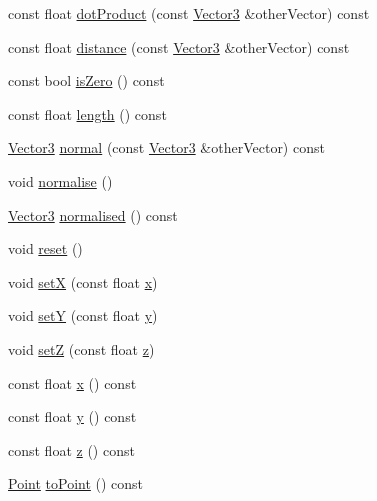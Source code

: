 \begin{DoxyCompactItemize}
\item 
const float \hyperlink{classprism_1_1_vector3_a8ce2bae07d8ac9f088fed29ed036cbd1}{dot\+Product} (const \hyperlink{classprism_1_1_vector3}{Vector3} \&other\+Vector) const 
\item 
const float \hyperlink{classprism_1_1_vector3_a72eac07134d9a15a6f87f9fd29cc716a}{distance} (const \hyperlink{classprism_1_1_vector3}{Vector3} \&other\+Vector) const 
\item 
const bool \hyperlink{classprism_1_1_vector3_ab8ee6e427e50070a85aeb07d417b7ea1}{is\+Zero} () const 
\item 
const float \hyperlink{classprism_1_1_vector3_a0d0e7d76a7c50f29bc37b8176eb04d32}{length} () const 
\item 
\hyperlink{classprism_1_1_vector3}{Vector3} \hyperlink{classprism_1_1_vector3_a3dea9d05ac3786470ecaaac2e9e1fbfb}{normal} (const \hyperlink{classprism_1_1_vector3}{Vector3} \&other\+Vector) const 
\item 
void \hyperlink{classprism_1_1_vector3_a26d76e02209e76bc883ed8e4ba337dd8}{normalise} ()
\item 
\hyperlink{classprism_1_1_vector3}{Vector3} \hyperlink{classprism_1_1_vector3_afb7639a382c2b249ea291731c2cb1ed3}{normalised} () const 
\item 
void \hyperlink{classprism_1_1_vector3_a848d54404144dc09f32d6065e91aa6a1}{reset} ()
\item 
void \hyperlink{classprism_1_1_vector3_a6a8df0f4941b7dab881a88f08f20555f}{setX} (const float \hyperlink{classprism_1_1_vector3_a6cd6b0776fc0eae2068f2610b882bb9f}{x})
\item 
void \hyperlink{classprism_1_1_vector3_a14e54c21f7b7349bdc0accdba8bdf27e}{setY} (const float \hyperlink{classprism_1_1_vector3_ad1e152047e314b334b4ccb5ab665640c}{y})
\item 
void \hyperlink{classprism_1_1_vector3_a11737fc5a6e49ccea73916795ed26d1a}{setZ} (const float \hyperlink{classprism_1_1_vector3_af760dbfa2ae9747794f1a542395306b8}{z})
\item 
const float \hyperlink{classprism_1_1_vector3_a6cd6b0776fc0eae2068f2610b882bb9f}{x} () const 
\item 
const float \hyperlink{classprism_1_1_vector3_ad1e152047e314b334b4ccb5ab665640c}{y} () const 
\item 
const float \hyperlink{classprism_1_1_vector3_af760dbfa2ae9747794f1a542395306b8}{z} () const 
\item 
\hyperlink{classprism_1_1_point}{Point} \hyperlink{classprism_1_1_vector3_adad7647133bf35b64789b0418f2d1c67}{to\+Point} () const 

\end{DoxyCompactItemize}
